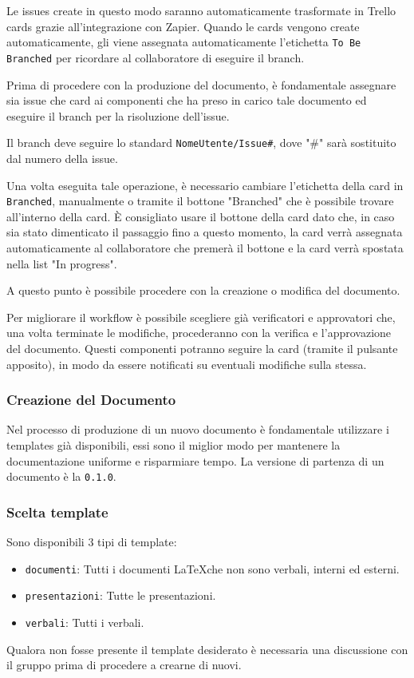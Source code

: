 Le issues create in questo modo saranno automaticamente trasformate in Trello cards grazie all'integrazione con Zapier.
Quando le cards vengono create automaticamente, gli viene assegnata automaticamente l'etichetta \texttt{To Be Branched} per ricordare al collaboratore di eseguire il branch.

Prima di procedere con la produzione del documento, è fondamentale assegnare sia issue che card ai componenti che ha preso in carico tale documento ed eseguire il branch per la risoluzione dell'issue.

Il branch deve seguire lo standard \texttt{NomeUtente/Issue\#}, dove "\#" sarà sostituito dal numero della issue.

Una volta eseguita tale operazione, è necessario cambiare l'etichetta della card in \texttt{Branched}, manualmente o tramite il bottone "Branched" che è possibile trovare all'interno della card.
È consigliato usare il bottone della card dato che, in caso sia stato dimenticato il passaggio fino a questo momento, la card verrà assegnata automaticamente al collaboratore che premerà il bottone e la card verrà spostata nella list "In progress".

A questo punto è possibile procedere con la creazione o modifica del documento.

Per migliorare il workflow è possibile scegliere già verificatori e approvatori che, una volta terminate le modifiche, procederanno con la verifica e l'approvazione del documento. Questi componenti potranno seguire la card (tramite il pulsante apposito), in modo da essere notificati su eventuali modifiche sulla stessa.

\subsubsection{Creazione del Documento}
Nel processo di produzione di un nuovo documento è fondamentale utilizzare i templates già
disponibili, essi sono il miglior modo per mantenere la documentazione uniforme e
risparmiare tempo.
La versione di partenza di un documento è la \texttt{0.1.0}.

\subsubsection{Scelta template}

Sono disponibili 3 tipi di template:
\begin{itemize}
    \item \texttt{documenti}: Tutti i documenti \LaTeX che non sono verbali, interni ed esterni.
    \item \texttt{presentazioni}: Tutte le presentazioni.
    \item \texttt{verbali}: Tutti i verbali.
\end{itemize}
Qualora non fosse presente il template desiderato è necessaria una discussione con il gruppo prima di procedere a crearne di nuovi.

